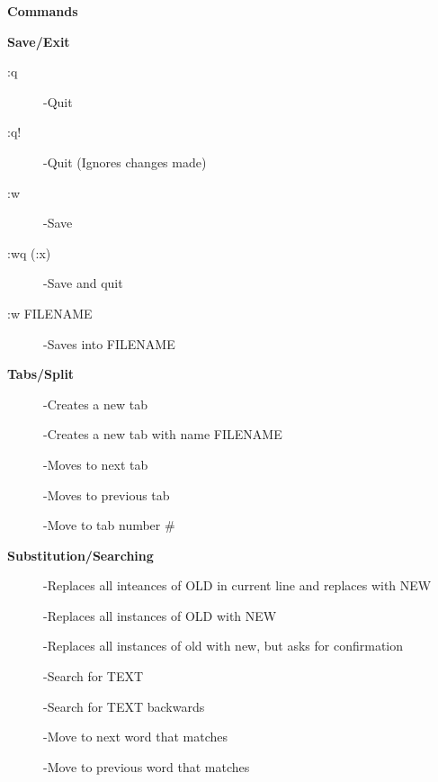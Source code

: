 \documentclass{article}
\begin{document}
\newpage




\begin{center}
\Huge\textbf{Commands}
\end{center}

\begin{multicols}{3}
\begin{center}
\Large\textbf{Save/Exit}
\end{center}
\begin{description}
\item[:q] \hfill
-Quit
\item[:q!] \hfill
-Quit (Ignores changes made)
\item[:w] \hfill
-Save
\item[:wq (:x)] \hfill
-Save and quit
\item[:w FILENAME] \hfill
-Saves into FILENAME
\end{description}
\begin{center}
\Large\textbf{Tabs/Split}
\end{center}
\begin{description}
\item[]
-Creates a new tab
\item[]
-Creates a new tab with name FILENAME
\item[] 
-Moves to next tab
\item[] 
-Moves to previous tab
\item[]
-Move to tab number \#
\end{description}

\columnbreak
\begin{center}
\Large\textbf{Substitution/Searching}
\end{center}
\begin{description}
\item[]
-Replaces all inteances of OLD in current line and replaces with NEW
\item[] 
-Replaces all instances of OLD with NEW
\item[]
-Replaces all instances of old with new, but asks for confirmation
\end{description}
\begin{description}
\item[] 
-Search for TEXT
\item[] 
-Search for TEXT backwards
\item[] 
-Move to next word that matches
\item[]
-Move to previous word that matches
\end{description}


\end{multicols}
\end{document}
